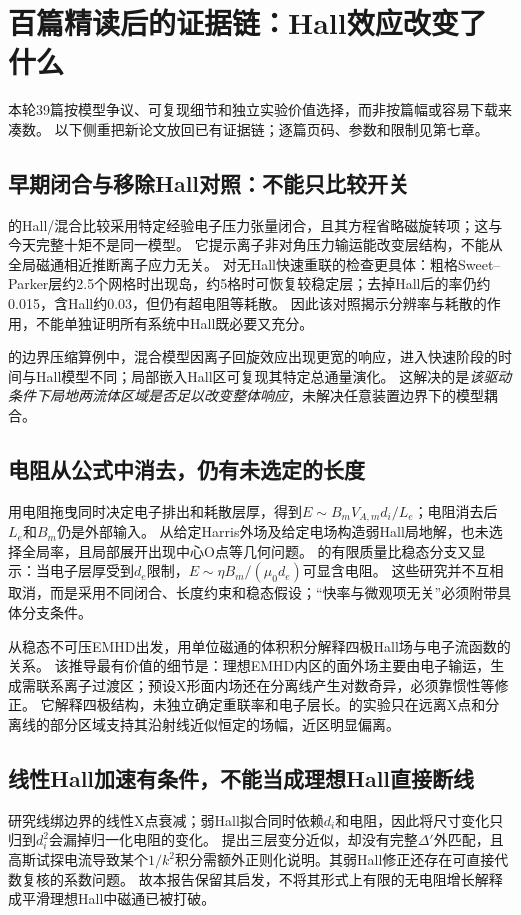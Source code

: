 \section{百篇精读后的证据链：Hall效应改变了什么}
本轮39篇按模型争议、可复现细节和独立实验价值选择，而非按篇幅或容易下载来凑数。
以下侧重把新论文放回已有证据链；逐篇页码、参数和限制见第七章。

\subsection{早期闭合与移除Hall对照：不能只比较开关}
\citet{L029}的Hall/混合比较采用特定经验电子压力张量闭合，且其方程省略磁旋转项；这与今天完整十矩不是同一模型。
它提示离子非对角压力输运能改变层结构，不能从全局磁通相近推断离子应力无关。
\citet{L154}对无Hall快速重联的检查更具体：粗格Sweet--Parker层约2.5个网格时出现岛，约5格时可恢复较稳定层；去掉Hall后的率仍约0.015，含Hall约0.03，但仍有超电阻等耗散。
因此该对照揭示分辨率与耗散的作用，不能单独证明所有系统中Hall既必要又充分。

\citet{L035}的边界压缩算例中，混合模型因离子回旋效应出现更宽的响应，进入快速阶段的时间与Hall模型不同；局部嵌入Hall区可复现其特定总通量演化。
这解决的是\emph{该驱动条件下局地两流体区域是否足以改变整体响应}，未解决任意装置边界下的模型耦合。

\subsection{电阻从公式中消去，仍有未选定的长度}
\citet{L145}用电阻拖曳同时决定电子排出和耗散层厚，得到$E\sim B_mV_{\!A,m}d_i/L_e$；电阻消去后$L_e$和$B_m$仍是外部输入。
\citet{L137}从给定Harris外场及给定电场构造弱Hall局地解，也未选择全局率，且局部展开出现中心O点等几何问题。
\citet{L160}的有限质量比稳态分支又显示：当电子层厚受到$d_e$限制，$E\sim\eta B_m/(\mu_0d_e)$可显含电阻。
这些研究并不互相取消，而是采用不同闭合、长度约束和稳态假设；“快率与微观项无关”必须附带具体分支条件。

\citet{L089}从稳态不可压EMHD出发，用单位磁通的体积积分解释四极Hall场与电子流函数的关系。
该推导最有价值的细节是：理想EMHD内区的面外场主要由电子输运，生成需联系离子过渡区；预设X形面内场还在分离线产生对数奇异，必须靠惯性等修正。
它解释四极结构，未独立确定重联率和电子层长。\citet{L119}的实验只在远离X点和分离线的部分区域支持其沿射线近似恒定的场幅，近区明显偏离。

\subsection{线性Hall加速有条件，不能当成理想Hall直接断线}
\citet{L123}研究线绑边界的线性X点衰减；弱Hall拟合同时依赖$d_i$和电阻，因此将尺寸变化只归到$d_i^2$会漏掉归一化电阻的变化。
\citet{L122}提出三层变分近似，却没有完整$\Delta'$外匹配，且高斯试探电流导致某个$1/k^2$积分需额外正则化说明。其弱Hall修正还存在可直接代数复核的系数问题。
故本报告保留其启发，不将其形式上有限的无电阻增长解释成平滑理想Hall中磁通已被打破。

